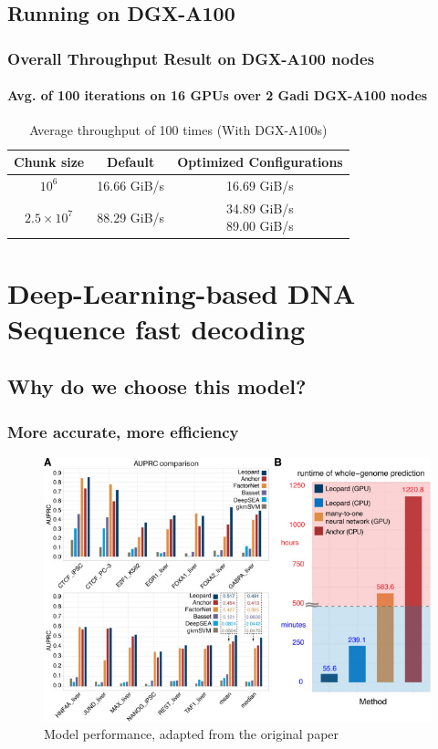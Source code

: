\documentclass{beamer}
\begin{document}
\subsection{Running on DGX-A100}

\begin{frame}
    
    \frametitle{Overall Throughput Result on DGX-A100 nodes}
    \framesubtitle{Avg. of 100 iterations on 16 GPUs over 2 Gadi DGX-A100 nodes}
    \begin{table}[h!]
    \centering
    \caption{Average throughput of 100 times (With DGX-A100s)}
    \begin{tabular}{c|c|c}
      \textbf{Chunk size} & \textbf{Default} & \textbf{Optimized Configurations}\\
      \hline
      $10^6$ & 16.66 GiB/s & 16.69 GiB/s\\
      $2.5\times10^7$ & 88.29 GiB/s & \makecell{34.89 GiB/s\footnotemark\\89.00 GiB/s\footnotemark}
    \end{tabular}
    \label{tab:a100}
\end{table}
\end{frame}

\section{Deep-Learning-based DNA Sequence fast decoding}

\subsection{Why do we choose this
model?}

\begin{frame}
    \frametitle{More accurate, more
efficiency}
    \begin{figure}
        \centering
        \includegraphics[width=0.78\linewidth]{model_perf}
        \caption{Model performance, adapted from the original paper}
    \end{figure}
\end{frame}
\end{document}
